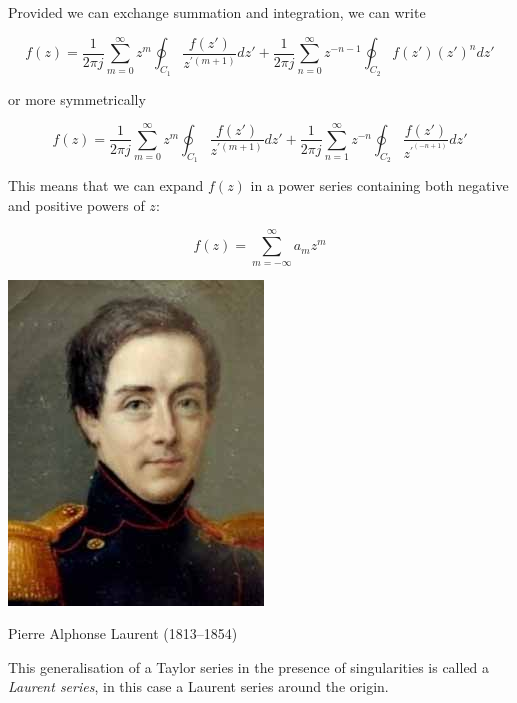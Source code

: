 Provided we can exchange summation and integration, we can write

\begin{equation}
f(z)=\frac{1}{2 \pi j } \sum_{m=0}^{\infty} z^m \oint_{{C}_1} \frac{f(z')}{z^{\prime (m+1)}} dz' + \frac{1}{2 \pi j } \sum_{n=0}^{\infty} z ^ {-n-1} \oint_{{C}_2}  {f(z')}  (z')^ n dz'
\end{equation} 

or more symmetrically

\begin{equation}
f(z)=\frac{1}{2 \pi j } \sum_{m=0}^{\infty} z^m \oint_{{C}_1} \frac{f(z')}{z^{\prime (m+1)}} dz' + \frac{1}{2 \pi j } \sum_{n=1}^{\infty} z ^ {-n} \oint_{{C}_2} \frac{f(z')}{z^{\prime^ {(-n+1)}}} dz'
\label{eq-laurent-int}
\end{equation} 

This means that we can expand $f(z)$ in a power series containing both negative and positive powers of $z$:

\begin{equation}
f(z)= \sum_{m=-\infty}^{\infty} a_m z^m
\end{equation} 

\begin{marginfigure}[-2.0cm]
  \includegraphics{complex/figures/pierre_laurent}
  \caption{Pierre Alphonse Laurent (1813–1854)}
\end{marginfigure}

This generalisation of a Taylor series in the presence of singularities is called a \emph{Laurent series}, in this case a Laurent series around the origin.


